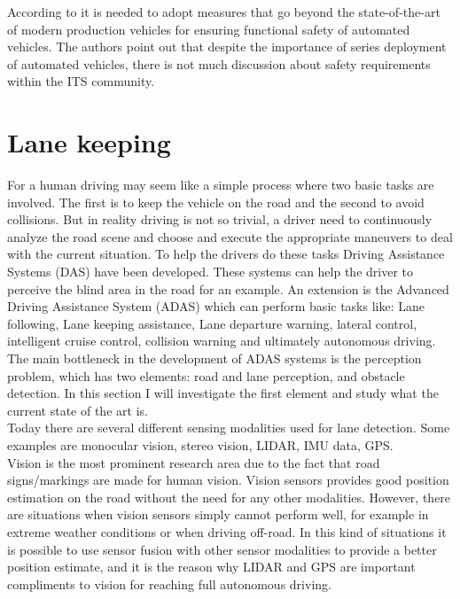 According to \cite{stolte2016safety} it is needed to adopt measures that go beyond the state-of-the-art of modern production vehicles for ensuring functional safety of automated vehicles. The authors point out that despite the importance of series deployment of automated vehicles, there is not much discussion about safety requirements within the ITS community.  


\section{Lane keeping}
For a human driving may seem like a simple process where two basic tasks are involved. The first is to keep the vehicle on the road and the second to avoid collisions. But in reality driving is not so trivial, a driver need to continuously analyze the road scene and choose and execute the appropriate maneuvers to deal with the current situation. To help the drivers do these tasks Driving Assistance Systems (DAS) have been developed. These systems can help the driver to perceive the blind area in the road for an example. An extension is the Advanced Driving Assistance System (ADAS) which can perform basic tasks like: Lane following, Lane keeping assistance, Lane departure warning, lateral control, intelligent cruise control, collision warning and ultimately autonomous driving.\\

The main bottleneck in the development of ADAS systems is the perception problem, which has two elements: road and lane perception, and obstacle detection. In this section I will investigate the first element and study what the current state of the art is.\\

Today there are several different sensing modalities used for lane detection. Some examples are monocular vision, stereo vision, LIDAR, IMU data, GPS.\\


Vision is the most prominent research area due to the fact that road signs/markings are made for human vision. Vision sensors provides good position estimation on the road without the need for any other modalities. However, there are situations when vision sensors simply cannot perform well, for example in extreme weather conditions or when driving off-road. In this kind of situations it is possible to use sensor fusion with other sensor modalities to provide a better position estimate, and it is the reason why LIDAR and GPS are important compliments to vision for reaching full autonomous driving.\\


